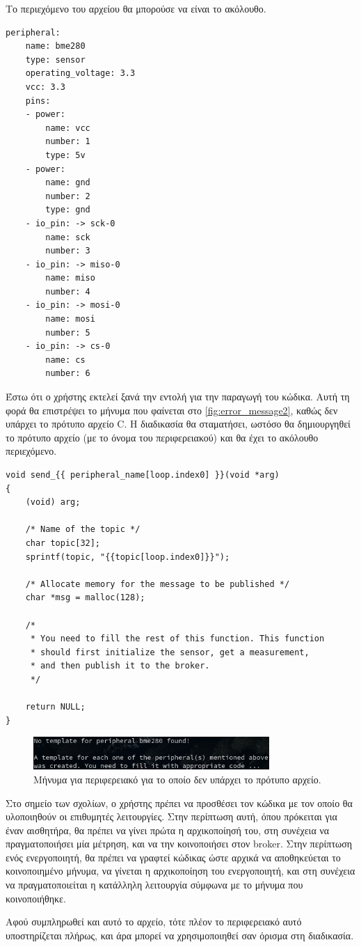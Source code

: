Το περιεχόμενο του αρχείου θα μπορούσε να είναι το ακόλουθο.

\begin{lstlisting}
peripheral:
	name: bme280
	type: sensor
	operating_voltage: 3.3
	vcc: 3.3
	pins:
	- power:
		name: vcc
		number: 1
		type: 5v
	- power:
		name: gnd
		number: 2
		type: gnd
	- io_pin: -> sck-0
		name: sck
		number: 3
	- io_pin: -> miso-0
		name: miso
		number: 4
	- io_pin: -> mosi-0
		name: mosi
		number: 5
	- io_pin: -> cs-0
		name: cs
		number: 6
\end{lstlisting}

Έστω ότι ο χρήστης εκτελεί ξανά την εντολή για την παραγωγή του κώδικα. Αυτή τη φορά θα επιστρέψει το μήνυμα που φαίνεται στο \autoref{fig:error_message2}, καθώς δεν υπάρχει το πρότυπο αρχείο C. Η διαδικασία θα σταματήσει, ωστόσο θα δημιουργηθεί το πρότυπο αρχείο (με το όνομα του περιφερειακού) και θα έχει το ακόλουθο περιεχόμενο.

\begin{lstlisting}
void send_{{ peripheral_name[loop.index0] }}(void *arg)
{
	(void) arg;
	
	/* Name of the topic */
	char topic[32];
	sprintf(topic, "{{topic[loop.index0]}}");
	
	/* Allocate memory for the message to be published */
	char *msg = malloc(128);
	
	/*
	 * You need to fill the rest of this function. This function 
	 * should first initialize the sensor, get a measurement,
	 * and then publish it to the broker. 
	 */
	
	return NULL;
}
\end{lstlisting}

\begin{figure}[!ht]
	\centering
	\includegraphics[width=0.8\textwidth]{./images/chapter6/error_message2.png}
	\caption{Μήνυμα για περιφερειακό για το οποίο δεν υπάρχει το πρότυπο αρχείο.}
	\label{fig:error_message2}
\end{figure}

Στο σημείο των σχολίων, ο χρήστης πρέπει να προσθέσει τον κώδικα με τον οποίο θα υλοποιηθούν οι επιθυμητές λειτουργίες. Στην περίπτωση αυτή, όπου πρόκειται για έναν αισθητήρα, θα πρέπει να γίνει πρώτα η αρχικοποίησή του, στη συνέχεια να πραγματοποιήσει μία μέτρηση, και να την κοινοποιήσει στον broker. Στην περίπτωση ενός ενεργοποιητή, θα πρέπει να γραφτεί κώδικας ώστε αρχικά να αποθηκεύεται το κοινοποιημένο μήνυμα, να γίνεται η αρχικοποίηση του ενεργοποιητή, και στη συνέχεια να πραγματοποιείται η κατάλληλη λειτουργία σύμφωνα με το μήνυμα που κοινοποιήθηκε.

Αφού συμπληρωθεί και αυτό το αρχείο, τότε πλέον το περιφερειακό αυτό υποστηρίζεται πλήρως, και άρα μπορεί να χρησιμοποιηθεί σαν όρισμα στη διαδικασία.
